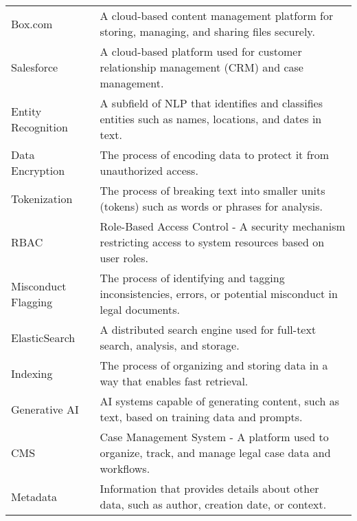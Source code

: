 \documentclass[11pt]{article}
\begin{document}
\begin{longtable}{|l|p{10cm}|}
Box.com & A cloud-based content management platform for storing, managing, and
sharing files securely. \\

Salesforce & A cloud-based platform used for customer relationship management (CRM)
and case management. \\

Entity Recognition &  A subfield of NLP that identifies and classifies entities such as names, locations, and dates in text. \\

Data Encryption & The process of encoding data to protect it from unauthorized access. \\ 

Tokenization & The process of breaking text into smaller units (tokens) such as words or phrases for analysis. \\ 

RBAC & Role-Based Access Control - A security mechanism restricting access to system resources based on user roles. \\ 

Misconduct Flagging & The process of identifying and tagging inconsistencies, errors, or potential misconduct in legal documents. \\

ElasticSearch & A distributed search engine used for full-text search, analysis, and storage. \\ 

Indexing & The process of organizing and storing data in a way that enables fast retrieval. \\ 

Generative AI & AI systems capable of generating content, such as text, based on training data and prompts. \\

CMS & Case Management System - A platform used to organize, track, and manage legal case data and workflows. \\ 

Metadata &Information that provides details about other data, such as author, creation
date, or context. \\ 



\hline
\end{longtable}

\newpage
\end{document}

